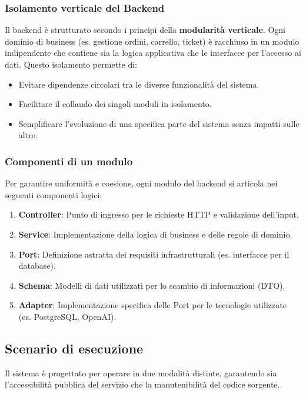 \documentclass[a4paper, 11pt, oneside]{scrartcl}
\begin{document}
\subsubsection{Isolamento verticale del Backend}
Il backend è strutturato secondo i principi della \textbf{modularità verticale}. Ogni dominio di business (es. gestione ordini, carrello, ticket) è
      racchiuso in un modulo indipendente che contiene sia la logica applicativa che le interfacce per l'accesso ai dati. Questo isolamento permette di:
\begin{itemize}
    \item Evitare dipendenze circolari tra le diverse funzionalità del sistema.
    \item Facilitare il collaudo dei singoli moduli in isolamento.
    \item Semplificare l'evoluzione di una specifica parte del sistema senza impatti sulle altre.
\end{itemize}

\subsubsection{Componenti di un modulo}
Per garantire uniformità e coesione, ogni modulo del backend si articola nei seguenti componenti logici:
\begin{enumerate}
    \item \textbf{Controller}: Punto di ingresso per le richieste HTTP e validazione dell'input.
    \item \textbf{Service}: Implementazione della logica di business e delle regole di dominio.
    \item \textbf{Port}: Definizione astratta dei requisiti infrastrutturali (es. interfacce per il database).
    \item \textbf{Schema}: Modelli di dati utilizzati per lo scambio di informazioni (DTO).
    \item \textbf{Adapter}: Implementazione specifica delle Port per le tecnologie utilizzate (es. PostgreSQL, OpenAI).
\end{enumerate}

\subsection{Scenario di esecuzione}
Il sistema è progettato per operare in due modalità distinte, garantendo sia l'accessibilità pubblica del servizio che la manutenibilità del codice
      sorgente.
\end{document}
